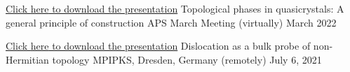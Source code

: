 

\begin{cventries}

  \cventry
    {\href{https://drive.google.com/file/d/1HrlFGdNeFf5c6VuSyOaXjgsDxlA-f_bh/view?usp=sharing}{Click \underline{here} to download the presentation}} %
    {Topological phases in quasicrystals:
    	A general principle of construction} %
    {APS March Meeting (virtually)} %
    {March 2022} %
    {
      \begin{cvitems} %
      \end{cvitems}
    }

  \cventry
	{\href{https://drive.google.com/file/d/18EtxINc68yc_Dt_sxsVkAIQNs8viJxYq/view?usp=sharing}{Click \underline{here} to download the presentation}} %
	{Dislocation as a bulk probe of non-Hermitian topology} %
	{MPIPKS, Dresden, Germany (remotely)} %
	{July 6, 2021} %
	{
		\begin{cvitems} %
		\end{cvitems}
	}
\end{cventries}
